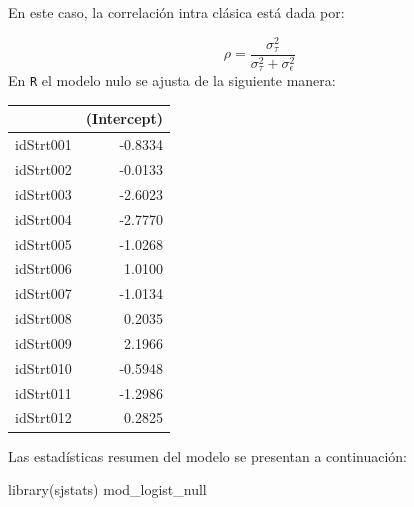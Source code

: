 \documentclass[
  12pt,
]{book}
\newenvironment{Shaded}{\begin{snugshade}}{\end{snugshade}}
\newcommand{\AttributeTok}[1]{\textcolor[rgb]{0.77,0.63,0.00}{#1}}
\newcommand{\DecValTok}[1]{\textcolor[rgb]{0.00,0.00,0.81}{#1}}
\newcommand{\FunctionTok}[1]{\textcolor[rgb]{0.00,0.00,0.00}{#1}}
\newcommand{\NormalTok}[1]{#1}
\newcommand{\OtherTok}[1]{\textcolor[rgb]{0.56,0.35,0.01}{#1}}
\newcommand{\SpecialCharTok}[1]{\textcolor[rgb]{0.00,0.00,0.00}{#1}}
\newcommand{\StringTok}[1]{\textcolor[rgb]{0.31,0.60,0.02}{#1}}
\begin{document}
En este caso, la correlación intra clásica está dada por:

\[
\rho=\frac{\sigma_{\tau}^{2}}{\sigma_{\tau}^{2}+\sigma_{\epsilon}^{2}}
\]
En \texttt{R} el modelo nulo se ajusta de la siguiente manera:

\begin{Shaded}
\end{Shaded}

\begin{tabular}{l|r}
\hline
  & (Intercept)\\
\hline
idStrt001 & -0.8334\\
\hline
idStrt002 & -0.0133\\
\hline
idStrt003 & -2.6023\\
\hline
idStrt004 & -2.7770\\
\hline
idStrt005 & -1.0268\\
\hline
idStrt006 & 1.0100\\
\hline
idStrt007 & -1.0134\\
\hline
idStrt008 & 0.2035\\
\hline
idStrt009 & 2.1966\\
\hline
idStrt010 & -0.5948\\
\hline
idStrt011 & -1.2986\\
\hline
idStrt012 & 0.2825\\
\hline
\end{tabular}

Las estadísticas resumen del modelo se presentan a continuación:

\begin{Shaded}
\begin{Highlighting}[]
\FunctionTok{library}\NormalTok{(sjstats)}
\NormalTok{mod\_logist\_null}
\end{Highlighting}
\end{Shaded}
\end{document}
